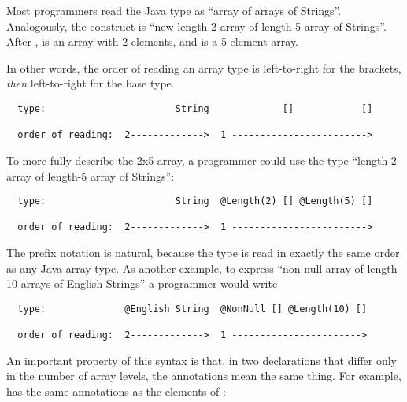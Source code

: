 \documentclass[10pt]{article}
\begin{document}
Most programmers read the Java type  as
``array of arrays of Strings''.  Analogously, the construct
 is ``new length-2 array of length-5 array of Strings''.
After ,  is an array with
2 elements, and  is a 5-element array.

In other words, the order of reading an array type is left-to-right for the
brackets, \emph{then} left-to-right for the base type.

\begin{Verbatim}
  type:                       String             []            []

  order of reading:  2------------->  1 ------------------------>
\end{Verbatim}



To more fully describe the 2x5 array, a programmer could use the
type ``length-2 array of length-5 array of Strings'':

\begin{Verbatim}
  type:                       String  @Length(2) [] @Length(5) []

  order of reading:  2------------->  1 ------------------------>
\end{Verbatim}

The prefix notation is natural, because the type is read in exactly
the same order as any Java array type.  As another example, to express
``non-null array of length-10 arrays of English Strings'' a programmer
would write

\begin{Verbatim}
  type:              @English String  @NonNull [] @Length(10) []

  order of reading:  2------------->  1 ----------------------->
\end{Verbatim}




An important property of this syntax is that, in two declarations that
differ only in the number of array levels, the annotations mean the same
thing.  For example,  has
the same annotations as the elements of :
\end{document}
